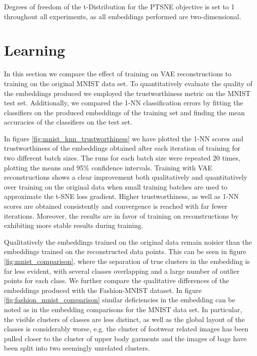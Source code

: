 Degrees of freedom of the t-Distribution for the PTSNE objective is set to 1 throughout all experiments, as all embeddings performed are two-dimensional.

\section{Learning}
\label{subsection:learning}

In this section we compare the effect of training on VAE reconstructions to training on the original MNIST data set. To quantitatively evaluate the quality of the embeddings produced we employed the trustworthiness metric \citep{trustworthiness} on the MNIST test set. Additionally, we compared the 1-NN classification errors by fitting the classifiers on the produced embeddings of the training set and finding the mean accuracies of the classifiers on the test set.

In figure \ref{fig:mnist_knn_trustworthiness} we have plotted the 1-NN scores and trustworthiness of the embeddings obtained after each iteration of training for two different batch sizes. The runs for each batch size were repeated 20 times, plotting the means and 95\% confidence intervals. Training with VAE reconstructions shows a clear improvement both qualitatively and quantitatively over training on the original data when small training batches are used to approximate the t-SNE loss gradient. Higher trustworthiness, as well as 1-NN scores are obtained consistently and convergence is reached with far fewer iterations. Moreover, the results are in favor of training on reconstructions by exhibiting more stable results during training.

Qualitatively the embeddings trained on the original data remain noisier than the embeddings trained on the reconstructed data points. This can be seen in figure \ref{fig:mnist_comparison}, where the separation of true clusters in the embedding is far less evident, with several classes overlapping and a large number of outlier points for each class. We further compare the qualitative differences of the embeddings produced with the Fashion-MNIST dataset. In figure \ref{fig:fashion_mnist_comparison} similar deficiencies in the embedding can be noted as in the embedding comparisons for the MNIST data set. In particular, the visible clusters of classes are less distinct, as well as the global layout of the classes is considerably worse, e.g. the cluster of footwear related images has been pulled closer to the cluster of upper body garments and the images of bags have been split into two seemingly unrelated clusters.


